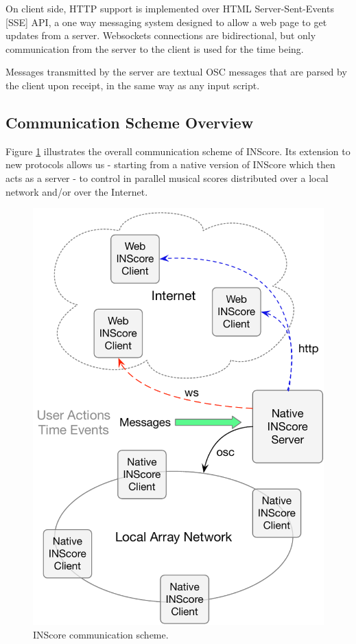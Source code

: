\documentclass{article}
\begin{document}
On client side, HTTP support is implemented over HTML Server-Sent-Events [SSE] API, a one way messaging system designed to allow a web page to get updates from a server. Websockets connections are bidirectional, but only communication from the server to the client is used for the time being.

Messages transmitted by the server are textual OSC messages that are parsed by the client upon receipt, in the same way as any input script.  

\subsection{Communication Scheme Overview}\label{sec:comm}

Figure \ref{fig:comm} illustrates the overall communication scheme of INScore. Its extension to new protocols allows us - starting from a native version of INScore which then acts as a server - to control in parallel musical scores distributed over a local network and/or over the Internet.

\begin{figure}[h]
\centering
\includegraphics[width=0.90\columnwidth]{rsrc/communication.pdf}
\caption{INScore communication scheme.}
\label{fig:comm}
\end{figure}
\end{document}
